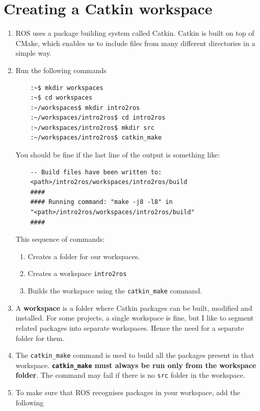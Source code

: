 \documentclass{article}
\begin{document}
    \section{Creating a Catkin workspace}
    \begin{enumerate}
        \item ROS uses a package building system called Catkin. 
        Catkin is built on top of CMake, which 
        enables us to include files from many different directories in a simple way.
        \item Run the following commands
        \begin{verbatim}
    :~$ mkdir workspaces 
    :~$ cd workspaces
    :~/workspaces$ mkdir intro2ros
    :~/workspaces/intro2ros$ cd intro2ros
    :~/workspaces/intro2ros$ mkdir src
    :~/workspaces/intro2ros$ catkin_make
        \end{verbatim}
        You should be fine if the last line of the output is something like:
        \begin{verbatim}
    -- Build files have been written to: 
    <path>/intro2ros/workspaces/intro2ros/build
    ####
    #### Running command: "make -j8 -l8" in 
    "<path>/intro2ros/workspaces/intro2ros/build"
    ####    
        \end{verbatim}
        This sequence of commands:
        \begin{enumerate}
            \item Creates a folder for our workspaces.
            \item Creates a workspace \texttt{intro2ros}
            \item Builds the workspace using the \texttt{catkin\_make} command.
        \end{enumerate}
        \item A \textbf{workspace} is a folder where Catkin packages can be built, modified
         and installed. For some projects, a single workspace is fine, 
         but I like to segment related packages into separate workspaces. Hence the need 
        for a separate folder for them.
        \item The \texttt{catkin\_make} command is used to build all 
        the packages present in that workspace. \textbf{\texttt{catkin\_make} 
        must always be run only from the workspace folder}. The command may fail if there is 
        no \texttt{src} folder in the workspace.
        \item To make sure that ROS recognises packages in your workspace, add the following

\end{enumerate}
\end{document}
